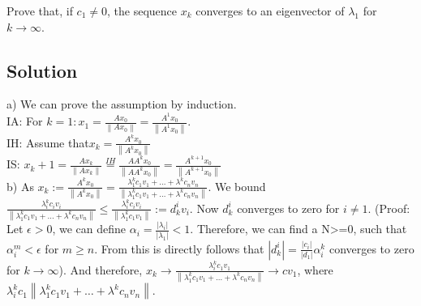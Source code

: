 \documentclass[10pt]{article}
\numberwithin{equation}{section}
\begin{document}
Prove that, if $c_1 \neq 0$, the sequence $x_k$ converges to an eigenvector of $\lambda_1$ for $k \rightarrow \infty$.
\subsection{Solution}
a) We can prove the assumption by induction. \\
IA: For $k=1: x_1=\frac{A x_0}{\left\|A x_0\right\|} = \frac{A^1x_0}{\left\|A^1x_0\right\|}$. \\
IH: Assume that$x_k = \frac{A^kx_0}{\left\|A^kx_0\right\|}$\\
IS: $x_k+1 = \frac{Ax_k}{\left\|Ax_k\right\|} \stackrel{IH}{=}\frac{AA^kx_0}{\left\|AA^kx_0\right\|} = \frac{A^{k+1}x_0}{\left\|A^{k+1}x_0\right\|}$\\
b) As $x_{k}:=\frac{A^k x_0}{\left\|A^k x_0\right\|} = \frac{\lambda_1^k c_1 v_1 + \dots + \lambda^k c_n v_n}{\left\| \lambda_1^k c_1 v_1 + \dots + \lambda^k c_n v_n \right\| } $. 
We bound   $ \frac{\lambda_i^k c_i v_i }{\left\| \lambda_1^k c_1 v_1 + \dots + \lambda^k c_n v_n \right\| }\leq \frac{\lambda_i^k c_i v_i}{\left\| \lambda_1^k c_1 v_1 \right \|}:= d^i_k v_i$.  Now  $d^i_k$ converges to zero for $i\neq 1$. (Proof: Let $\epsilon > 0$, we can define  $\alpha_i = \frac{|\lambda_i|}{|\lambda_1|} <1$. Therefore, we can find a N>=0, such that $\alpha_i^m<\epsilon$ for $m \geq n$. From this is directly follows that $|d^i_k| = \frac{|c_i|}{|d_1|} \alpha_i^k$ converges to zero for $k \to \infty$).  And therefore, $x_k \to \frac{\lambda_i^k c_1 v_1 }{\left\| \lambda_1^k c_1 v_1 + \dots + \lambda^k c_n v_n \right\| } \to cv_1$, where ${\lambda_i^k c_1 }{\left\| \lambda_1^k c_1 v_1 + \dots + \lambda^k c_n v_n \right\| }$. 
\end{document}
